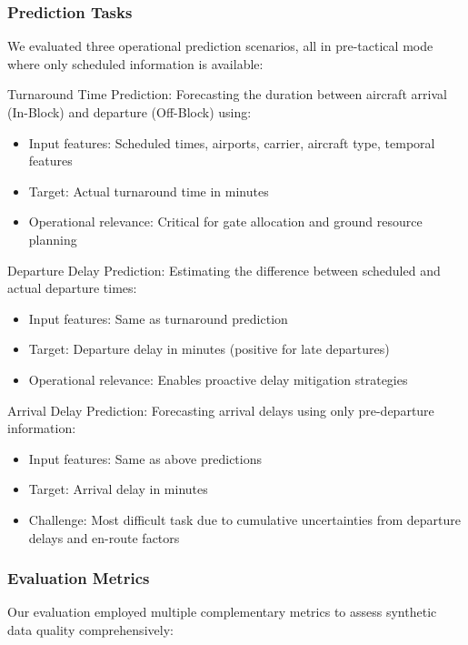 \documentclass[conference]{IEEEtran}
\begin{document}
\subsubsection{Prediction Tasks}

We evaluated three operational prediction scenarios, all in pre-tactical mode where only scheduled information is available:

Turnaround Time Prediction: 
Forecasting the duration between aircraft arrival (In-Block) and departure (Off-Block) using:
\begin{itemize}
    \item Input features: Scheduled times, airports, carrier, aircraft type, temporal features
    \item Target: Actual turnaround time in minutes
    \item Operational relevance: Critical for gate allocation and ground resource planning
\end{itemize}

Departure Delay Prediction:
Estimating the difference between scheduled and actual departure times:
\begin{itemize}
    \item Input features: Same as turnaround prediction
    \item Target: Departure delay in minutes (positive for late departures)
    \item Operational relevance: Enables proactive delay mitigation strategies
\end{itemize}

Arrival Delay Prediction:
Forecasting arrival delays using only pre-departure information:
\begin{itemize}
    \item Input features: Same as above predictions
    \item Target: Arrival delay in minutes
    \item Challenge: Most difficult task due to cumulative uncertainties from departure delays and en-route factors
\end{itemize}

\subsubsection{Evaluation Metrics}

Our evaluation employed multiple complementary metrics to assess synthetic data quality comprehensively:
\end{document}

